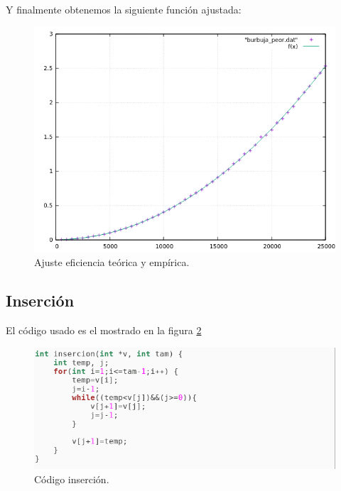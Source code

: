 Y finalmente obtenemos la siguiente función ajustada:
\begin{figure}[H]
    \begin{center}
        \includegraphics[scale=0.7]{imagenes/b_adj.png}
        \caption{Ajuste eficiencia teórica y empírica.}
        \label{fig3}
    \end{center}
\end{figure}


\subsection{Inserción}
El código usado es el mostrado en la figura  \ref{fig4}

\begin{figure}[H]
        \includegraphics[scale=0.7]{imagenes/insercion.png}
        \caption{Código inserción.}
        \label{fig4}
\end{figure}

